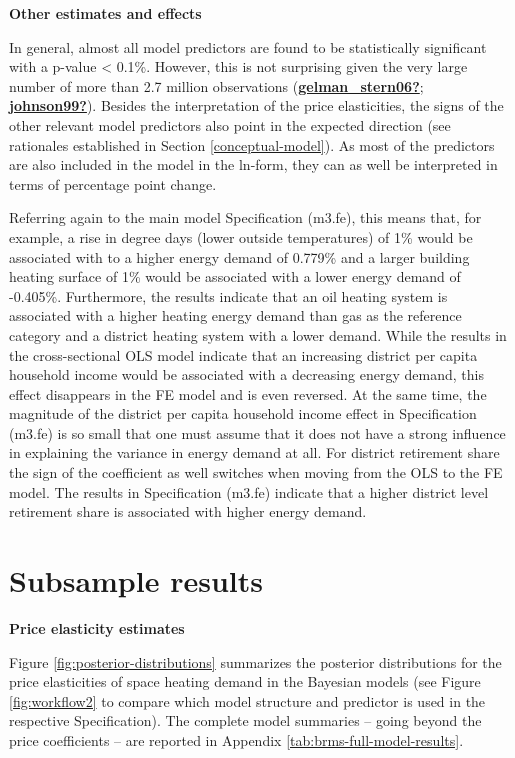 \documentclass[12pt,twoside]{reedthesis}
\begin{document}
\textbf{Other estimates and effects}

In general, almost all model predictors are found to be statistically significant with a p-value \textless{} 0.1\%. However, this is not surprising given the very large number of more than 2.7 million observations (\protect\hyperlink{ref-gelman_stern06}{\textbf{gelman\_stern06?}}; \protect\hyperlink{ref-johnson99}{\textbf{johnson99?}}). Besides the interpretation of the price elasticities, the signs of the other relevant model predictors also point in the expected direction (see rationales established in Section \ref{conceptual-model}). As most of the predictors are also included in the model in the ln-form, they can as well be interpreted in terms of percentage point change.

Referring again to the main model Specification (m3.fe), this means that, for example, a rise in degree days (lower outside temperatures) of 1\% would be associated with to a higher energy demand of 0.779\% and a larger building heating surface of 1\% would be associated with a lower energy demand of -0.405\%. Furthermore, the results indicate that an oil heating system is associated with a higher heating energy demand than gas as the reference category and a district heating system with a lower demand. While the results in the cross-sectional OLS model indicate that an increasing district per capita household income would be associated with a decreasing energy demand, this effect disappears in the FE model and is even reversed. At the same time, the magnitude of the district per capita household income effect in Specification (m3.fe) is so small that one must assume that it does not have a strong influence in explaining the variance in energy demand at all. For district retirement share the sign of the coefficient as well switches when moving from the OLS to the FE model. The results in Specification (m3.fe) indicate that a higher district level retirement share is associated with higher energy demand.

\hypertarget{subsample_results}{%
\section{Subsample results}\label{subsample_results}}

\textbf{Price elasticity estimates}

Figure \ref{fig:posterior-distributions} summarizes the posterior distributions for the price elasticities of space heating demand in the Bayesian models (see Figure \ref{fig:workflow2} to compare which model structure and predictor is used in the respective Specification). The complete model summaries -- going beyond the price coefficients -- are reported in Appendix \ref{tab:brms-full-model-results}.
\end{document}
